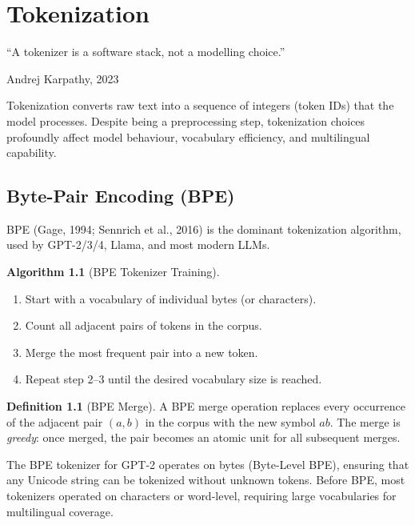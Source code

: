 \documentclass[11pt,a4paper]{book}
\theoremstyle{definition}
\newtheorem{definition}{Definition}[chapter]
\newtheorem{algorithm}{Algorithm}[chapter]
\begin{document}
\chapter{Tokenization}
\label{ch:tokenization}

\epigraph{``A tokenizer is a software stack, not a modelling choice.''}{Andrej Karpathy, 2023}

Tokenization converts raw text into a sequence of integers (token IDs) that the model processes. Despite being a preprocessing step, tokenization choices profoundly affect model behaviour, vocabulary efficiency, and multilingual capability.

\section{Byte-Pair Encoding (BPE)}

BPE (Gage, 1994; Sennrich et al., 2016) is the dominant tokenization algorithm, used by GPT-2/3/4, Llama, and most modern LLMs.

\begin{algorithm}[BPE Tokenizer Training]
	\begin{enumerate}
		\item Start with a vocabulary of individual bytes (or characters).
		\item Count all adjacent pairs of tokens in the corpus.
		\item Merge the most frequent pair into a new token.
		\item Repeat step 2--3 until the desired vocabulary size is reached.
	\end{enumerate}
\end{algorithm}

\begin{definition}[BPE Merge]
	A BPE merge operation replaces every occurrence of the adjacent pair $(a, b)$ in the corpus with the new symbol $ab$. The merge is \emph{greedy}: once merged, the pair becomes an atomic unit for all subsequent merges.
\end{definition}

The BPE tokenizer for GPT-2 operates on bytes (Byte-Level BPE), ensuring that any Unicode string can be tokenized without unknown tokens. Before BPE, most tokenizers operated on characters or word-level, requiring large vocabularies for multilingual coverage.
\end{document}
